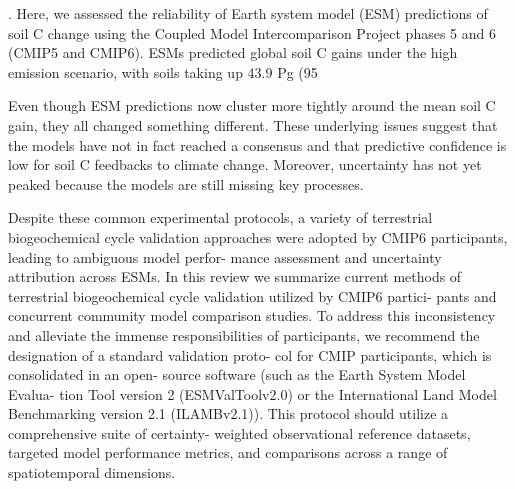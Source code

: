 \documentclass{article}
\begin{document}
\citep{Shi2024}
. Here, we assessed the reliability of Earth system model (ESM) predictions of soil C change using the Coupled Model Intercomparison Project phases 5 and 6 (CMIP5 and CMIP6). ESMs predicted global soil C gains under the high emission scenario, with soils taking up 43.9 Pg (95%

Even though ESM predictions now cluster more tightly around the mean soil C gain, they all changed something different. These underlying issues suggest that the models have not in fact reached a consensus and that predictive confidence is low for soil C feedbacks to climate change. Moreover, uncertainty has not yet peaked because the models are still missing key processes.

\citep{Spafford2021}
Despite these common experimental protocols, a variety of terrestrial biogeochemical cycle validation approaches were adopted by CMIP6 participants, leading to ambiguous model perfor- mance assessment and uncertainty attribution across ESMs. In this review we summarize current methods of terrestrial biogeochemical cycle validation utilized by CMIP6 partici- pants and concurrent community model comparison studies. To address this inconsistency and alleviate the immense responsibilities of participants, we recommend the designation of a standard validation proto- col for CMIP participants, which is consolidated in an open- source software (such as the Earth System Model Evalua- tion Tool version 2 (ESMValToolv2.0) or the International Land Model Benchmarking version 2.1 (ILAMBv2.1)). This protocol should utilize a comprehensive suite of certainty- weighted observational reference datasets, targeted model performance metrics, and comparisons across a range of spatiotemporal dimensions.
\end{document}
